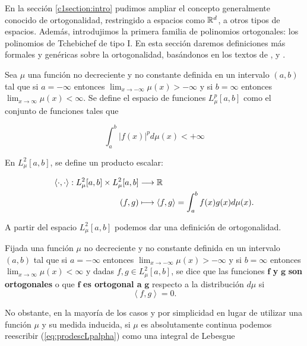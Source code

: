 En la sección \ref{c1section:intro} pudimos ampliar el concepto generalmente conocido de ortogonalidad, restringido a espacios como $\mathbb{R}^d$, a otros tipos de espacios. Además, introdujimos la primera familia de polinomios ortogonales: los polinomios de Tchebichef de tipo I. En esta sección daremos definiciones más formales y genéricas sobre la ortogonalidad, basándonos en los textos de \cite[Ch. II]{renato}, \cite[Ch. I]{chihara} y \cite[Ch. II, III]{szego}.

Sea $\mu$ una función no decreciente y no constante definida en un intervalo $(a,b)$ tal que si $a=-\infty$ entonces $\displaystyle\lim_{x\rightarrow-\infty}\mu(x)>-\infty$ y si $b=\infty$ entonces $\displaystyle\lim_{x\rightarrow\infty}\mu(x)<\infty$. Se define el espacio de funciones $L_\mu^p[a,b]$ como el conjunto de funciones tales que

$$
\int_a^b |f(x)|^p d\mu(x) < +\infty
$$

En $L_\mu^2[a,b]$, se define un producto escalar:

\begin{equation}
    \label{eq:prodescLpalpha}
    \begin{split}
        \left\langle\cdot,\cdot\right\rangle:L_\mu^2[a,b]\times L_\mu^2[a,b] &\longrightarrow \mathbb{R} \\
        (f,g)&\longmapsto \left\langle f,g \right\rangle=\int_a^b f(x)g(x)d\mu(x).
    \end{split}
\end{equation}

A partir del espacio $L_\mu^2[a,b]$ podemos dar una definición de ortogonalidad.

\begin{definicion}[Ortogonalidad]

    Fijada una función $\mu$ no decreciente y no constante definida en un intervalo $(a,b)$ tal que si $a=-\infty$ entonces $\displaystyle\lim_{x\rightarrow-\infty}\mu(x)>-\infty$ y si $b=\infty$ entonces $\displaystyle\lim_{x\rightarrow\infty}\mu(x)<\infty$ y dadas $f,g\in L_\mu^2[a,b]$, se dice que las funciones $\mathbf f$ \textbf y $\mathbf g$ \textbf{son ortogonales} o que $\mathbf f$ \textbf{es ortogonal a} $\mathbf{g}$ respecto a la distribución $d\mu$ si
    \begin{equation}
        \label{eq:defortogonalidad}
        \left\langle f,g\right\rangle = 0.
    \end{equation}
\end{definicion}

No obstante, en la mayoría de los casos y por simplicidad en lugar de utilizar una función $\mu$ y su medida inducida, si $\mu$ es absolutamente continua podemos reescribir (\ref{eq:prodescLpalpha}) como una integral de Lebesgue

